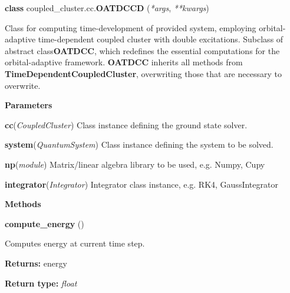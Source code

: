 \begin{tcolorbox}
    {\selectfont
    \textbf{class} coupled\_cluster.cc.\textbf{OATDCCD}
    (\emph{*args}, \emph{**kwargs})

    \vspace{1em}
    Class for computing time-development of provided system, employing orbital-adaptive 
    time-dependent coupled cluster with double excitations.   Subclass of abstract class\textbf{OATDCC}, which redefines the essential computations
    for the orbital-adaptive framework. \textbf{OATDCC} inherits all methods from 
    \textbf{TimeDependentCoupledCluster}, overwriting those that are necessary to overwrite.

    \vspace{1em}
    \textbf{Parameters}

    \hspace{2em}\textbf{cc}(\emph{CoupledCluster})
        Class instance defining the ground state solver.

    \hspace{2em}\textbf{system}(\emph{QuantumSystem}) 
        Class instance defining the system to be solved.

    \hspace{2em}\textbf{np}(\emph{module})
        Matrix/linear algebra library to be used, e.g. Numpy, Cupy
    
    \hspace{2em}\textbf{integrator}(\emph{Integrator})
        Integrator class instance, e.g. RK4, GaussIntegrator

    \vspace{1em}
    \textbf{Methods}

    \hspace{2em} \textbf{compute\_energy} ()
        \begin{adjustwidth}{4em}{}
        Computes energy at current time step.

        \textbf{Returns:} energy
        
        \textbf{Return type:} \emph{float}
        \end{adjustwidth}

    }
\end{tcolorbox}